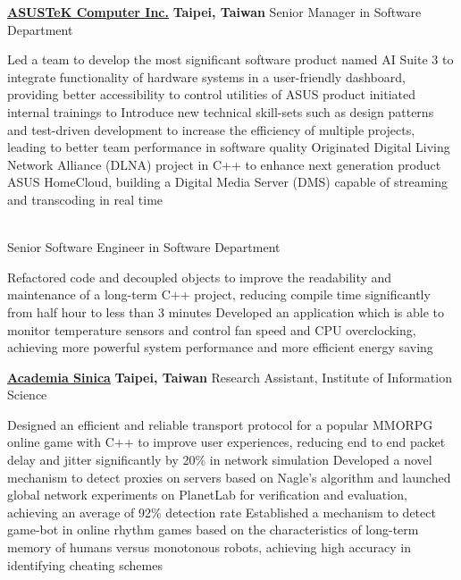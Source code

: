 \documentclass[a4paper,10pt,oneside]{article}
\begin{document}
\begin{body}
\SmallEntryGap
\href{http://www.asus.com/US/}
{\textbf{ASUSTeK Computer Inc.}}
\hfill
\textbf{Taipei, Taiwan}
Senior Manager in Software Department
\begin{detail}
\BulletItem
Led a team to develop the most significant software product named AI Suite 3 to integrate functionality of hardware systems in a user-friendly dashboard, providing better accessibility to control utilities of ASUS product
\BulletItem
initiated internal trainings to Introduce new technical skill-sets such as design patterns and test-driven development to increase the efficiency of multiple projects, leading to better team performance in software quality
\BulletItem
Originated Digital Living Network Alliance (DLNA) project in C++ to enhance next generation product ASUS HomeCloud, building a Digital Media Server (DMS) capable of streaming and transcoding in real time
\end{detail}
\\[-2em]
Senior Software Engineer in Software Department
\begin{detail}
\BulletItem
Refactored code and decoupled objects to improve the readability and maintenance of a long-term C++ project, reducing compile time significantly from half hour to less than 3 minutes
\BulletItem
Developed an application which is able to monitor temperature sensors and control fan speed and CPU overclocking, achieving more powerful system performance and more efficient energy saving
\end{detail}

\SmallEntryGap
\href{http://www.iis.sinica.edu.tw/index_en.html}
{\textbf{Academia Sinica}}
\hfill
\textbf{Taipei, Taiwan}
Research Assistant, Institute of Information Science
\begin{detail}
\BulletItem
Designed an efficient and reliable transport protocol for a popular MMORPG online game with C++ to improve user experiences, reducing end to end packet delay and jitter significantly by 20\% in network simulation
\BulletItem
Developed a novel mechanism to detect proxies on servers based on Nagle's algorithm and launched global network experiments on PlanetLab for verification and evaluation, achieving an average of 92\% detection rate
\BulletItem
Established a mechanism to detect game-bot in online rhythm games based on the characteristics of long-term memory of humans versus monotonous robots, achieving high accuracy in identifying cheating schemes
\end{detail}


\end{body}
\end{document}
